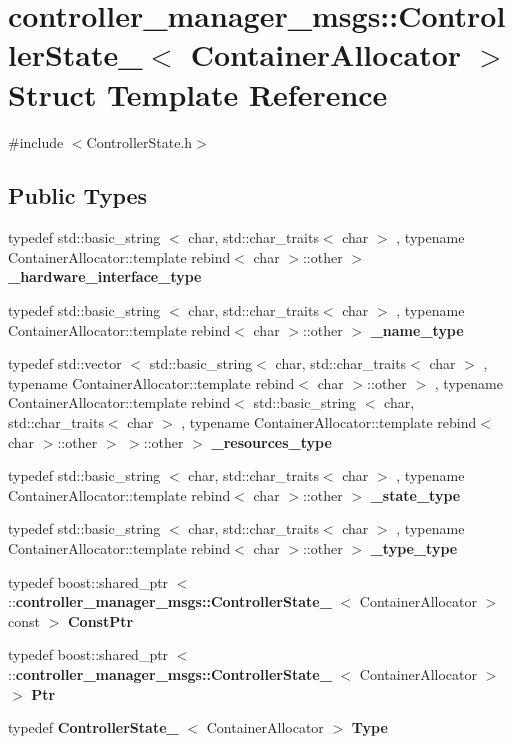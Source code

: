 \section{controller\-\_\-manager\-\_\-msgs\-:\-:\-Controller\-State\-\_\-$<$ \-Container\-Allocator $>$ \-Struct \-Template \-Reference}
\label{structcontroller__manager__msgs_1_1ControllerState__}


{\ttfamily \#include $<$\-Controller\-State.\-h$>$}

\subsection*{\-Public \-Types}
\begin{DoxyCompactItemize}
\item 
typedef std\-::basic\-\_\-string\*
$<$ char, std\-::char\-\_\-traits$<$ char $>$\*
, typename \*
\-Container\-Allocator\-::template \*
rebind$<$ char $>$\-::other $>$ {\bf \-\_\-hardware\-\_\-interface\-\_\-type}
\item 
typedef std\-::basic\-\_\-string\*
$<$ char, std\-::char\-\_\-traits$<$ char $>$\*
, typename \*
\-Container\-Allocator\-::template \*
rebind$<$ char $>$\-::other $>$ {\bf \-\_\-name\-\_\-type}
\item 
typedef std\-::vector\*
$<$ std\-::basic\-\_\-string$<$ char, \*
std\-::char\-\_\-traits$<$ char $>$\*
, typename \*
\-Container\-Allocator\-::template \*
rebind$<$ char $>$\-::other $>$\*
, typename \*
\-Container\-Allocator\-::template \*
rebind$<$ std\-::basic\-\_\-string\*
$<$ char, std\-::char\-\_\-traits$<$ char $>$\*
, typename \*
\-Container\-Allocator\-::template \*
rebind$<$ char $>$\-::other $>$\*
 $>$\-::other $>$ {\bf \-\_\-resources\-\_\-type}
\item 
typedef std\-::basic\-\_\-string\*
$<$ char, std\-::char\-\_\-traits$<$ char $>$\*
, typename \*
\-Container\-Allocator\-::template \*
rebind$<$ char $>$\-::other $>$ {\bf \-\_\-state\-\_\-type}
\item 
typedef std\-::basic\-\_\-string\*
$<$ char, std\-::char\-\_\-traits$<$ char $>$\*
, typename \*
\-Container\-Allocator\-::template \*
rebind$<$ char $>$\-::other $>$ {\bf \-\_\-type\-\_\-type}
\item 
typedef boost\-::shared\-\_\-ptr\*
$<$ \-::{\bf controller\-\_\-manager\-\_\-msgs\-::\-Controller\-State\-\_\-}\*
$<$ \-Container\-Allocator $>$ const  $>$ {\bf \-Const\-Ptr}
\item 
typedef boost\-::shared\-\_\-ptr\*
$<$ \-::{\bf controller\-\_\-manager\-\_\-msgs\-::\-Controller\-State\-\_\-}\*
$<$ \-Container\-Allocator $>$ $>$ {\bf \-Ptr}
\item 
typedef {\bf \-Controller\-State\-\_\-}\*
$<$ \-Container\-Allocator $>$ {\bf \-Type}
\end{DoxyCompactItemize}
